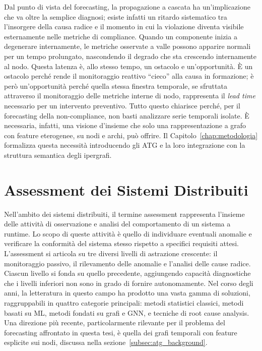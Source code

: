 Dal punto di vista del forecasting, la propagazione a cascata ha un'implicazione che va oltre 
la semplice diagnosi; esiste infatti un ritardo sistematico tra l'insorgere della causa radice 
e il momento in cui la violazione diventa visibile esternamente nelle metriche di compliance. 
Quando un componente inizia a degenerare internamente, le metriche osservate a
valle possono apparire normali per un tempo prolungato, nascondendo il degrado che sta
crescendo internamente al nodo. Questa latenza è, allo stesso tempo, un ostacolo e
un'opportunità. È un ostacolo perché rende il monitoraggio reattivo ``cieco'' alla causa in
formazione; è però un'opportunità perché quella stessa finestra temporale, se sfruttata
attraverso il monitoraggio delle metriche interne di nodo, rappresenta il \emph{lead time}
necessario per un intervento preventivo.
Tutto questo chiarisce perché, per il forecasting della non-compliance, non basti analizzare
serie temporali isolate. È necessaria, infatti, una visione d'insieme che solo una
rappresentazione a grafo con feature eterogenee, su nodi e archi, può offrire. Il
Capitolo~\ref{chap:metodologia} formalizza questa necessità introducendo gli \gls{ATG} e la
loro integrazione con la struttura semantica degli ipergrafi.

\section{Assessment dei Sistemi Distribuiti}
\label{sec:assessment}

Nell'ambito dei sistemi distribuiti, il termine assessment rappresenta l'insieme delle attività 
di osservazione e analisi del comportamento di un sistema a runtime. Lo scopo di queste attività 
è quello di individuare eventuali anomalie e verificare la conformità del sistema stesso rispetto 
a specifici requisiti attesi. L'assessment si articola su tre diversi livelli di astrazione crescente: 
il monitoraggio passivo, il rilevamento delle anomalie e l'analisi delle cause radice. 
Ciascun livello si fonda su quello precedente, aggiungendo capacità diagnostiche che i livelli 
inferiori non sono in grado di fornire autonomamente.
Nel corso degli anni, la letteratura in questo campo ha prodotto una vasta gamma di soluzioni, 
raggruppabili in quattro categorie principali: metodi statistici classici, metodi basati su \gls{ML}, 
metodi fondati su grafi e \gls{GNN}, e tecniche di root cause analysis. Una direzione più recente, 
particolarmente rilevante per il problema del forecasting affrontato in questa tesi, 
è quella dei grafi temporali con feature esplicite sui nodi, discussa nella sezione~\ref{subsec:atg_background}.

